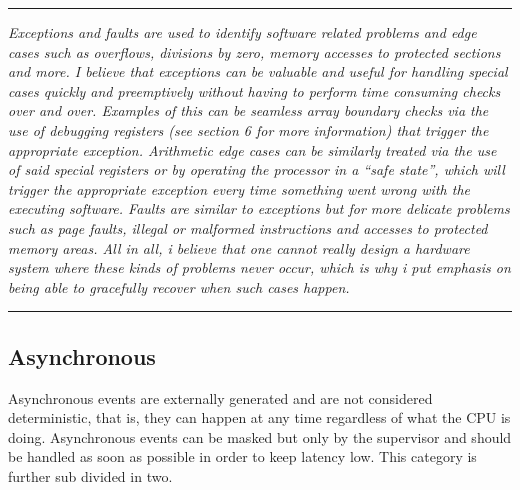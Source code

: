 \documentclass{article}
\begin{document}
        \par\noindent\rule{\textwidth}{0.4pt}
        \textit{Exceptions and faults are used to identify software related problems and edge cases such as overflows, divisions by zero, memory accesses to protected sections and more. I believe that exceptions can be valuable and useful for handling special cases quickly and preemptively without having to perform time consuming checks over and over. Examples of this can be seamless array boundary checks via the use of debugging registers (see section 6 for more information) that trigger the appropriate exception. Arithmetic edge cases can be similarly treated via the use of said special registers or by operating the processor in a ``safe state'', which will trigger the appropriate exception every time something went wrong with the executing software. Faults are similar to exceptions but for more delicate problems such as page faults, illegal or malformed instructions and accesses to protected memory areas. All in all, i believe that one cannot really design a hardware system where these kinds of problems never occur, which is why i put emphasis on being able to gracefully recover when such cases happen.}
        \par\noindent\rule{\textwidth}{0.4pt}

        \subsection{Asynchronous}

            \vspace{10pt}

            Asynchronous events are externally generated and are not considered deterministic, that is, they can happen at any time regardless of what the CPU is doing. Asynchronous events can be masked but only by the supervisor and should be handled as soon as possible in order to keep latency low. This category is further sub divided in two.
\end{document}
